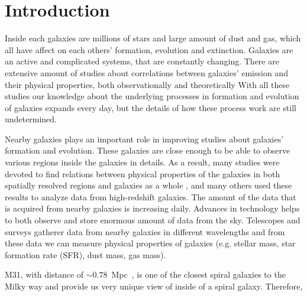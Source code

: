 \section{Introduction}
Inside each galaxies are millions of stars and large amount of dust and gas, which all have affect on each others' formation, evolution and extinction.
Galaxies are an active and complicated systems, that are constantly changing.
There are extensive amount of studies about correlations between galaxies' emission and their physical properties, both observationally and theoretically %
With all these studies our knowledge about the underlying processes in formation and evolution of galaxies expands every day, but the details of how these process work are still undetermined.

Nearby galaxies plays an important role in improving studies about galaxies' formation and evolution.
These galaxies are close enough to be able to observe various regions inside the galaxies in details.
As a result, many studies were devoted to find relations between physical properties of the galaxies in both spatially resolved regions and galaxies as a whole %
, and many others used these results to analyze data from high-redshift galaxies.%
The amount of the data that is acquired from nearby galaxies is increasing daily.
Advances in technology helps to both observe and store enormous amount of data from the sky.
Telescopes and surveys gatherer data from nearby galaxies in different wavelengths and from these data we can measure physical properties of galaxies (e.g. stellar mass, star formation rate (SFR), dust mass, gas mass). %

M31, with distance of $\sim 0.78$~Mpc~\citep{McConnachie05}, is one of the closest spiral galaxies to the Milky way and provide us very unique view of inside of a spiral galaxy.
Therefore,

